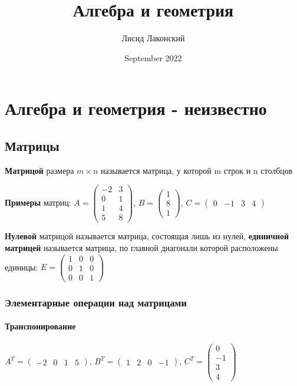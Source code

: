 \documentclass{article}
\title{Алгебра и геометрия}
\author{Лисид Лаконский}
\date{September 2022}
\begin{document}
\maketitle

\tableofcontents
\pagebreak

\section{Алгебра и геометрия - неизвестно}

\subsection{Матрицы}

\begin{flushleft}

\textbf{Матрицой} размера $m \times n$ называется матрица, у которой m строк и n столбцов

\textbf{Примеры} матриц: $A = \begin{pmatrix}
    -2 & 3 \\
    0 & 1 \\
    1 & 4 \\
    5 & 8
\end{pmatrix}$, $B = \begin{pmatrix}
    1 \\
    8 \\
    1
\end{pmatrix}$, $C = \begin{pmatrix}
    0 & -1 & 3 & 4
\end{pmatrix}$

\textbf{Нулевой} матрицой называется матрица, состоящая лишь из нулей, \textbf{единичной матрицей} называется матрица, по главной диагонали которой расположены единицы: $E = \begin{pmatrix}
    1 & 0 & 0 \\
    0 & 1 & 0 \\
    0 & 0 & 1
\end{pmatrix}$

\subsubsection{Элементарные операции над матрицами}

\paragraph{Транспонирование} $A^T = \begin{pmatrix}
    -2 & 0 & 1 & 5
\end{pmatrix}$, $B^T = \begin{pmatrix}
    1 & 2 & 0 & -1
\end{pmatrix}$, $C^T = \begin{pmatrix}
    0 \\
    -1 \\
    3 \\ 4
\end{pmatrix}$


\end{flushleft}
\end{document}
